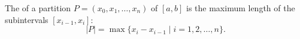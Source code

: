 The  of a partition $P = (x_0, x_1, \ldots, x_n)$ of $[a, b]$ is the maximum length of the subintervals $[x_{i-1}, x_i]$:
$$|P| = \max \{x_i - x_{i-1} \mid i = 1, 2, \ldots, n\}.$$
